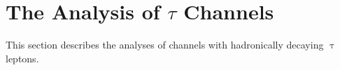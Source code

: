\section{The Analysis of $\tau$ Channels }
\label{sec:taus}

This section describes the analyses of channels with hadronically decaying $\uptau$ leptons.






